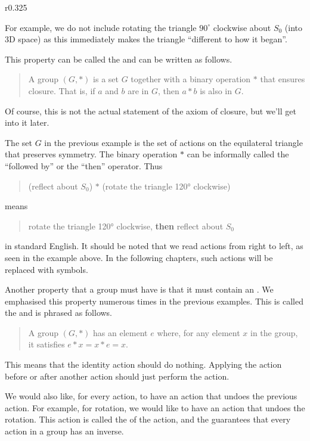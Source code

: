 \begin{wrapfigure}{r}{0.325\textwidth}
    \centering
\end{wrapfigure}

For example, we do not include rotating the triangle $90^\circ$ clockwise about $S_0$ (into 3D space) as this immediately makes the triangle ``different to how it began''.

This property can be called the  and can be written as follows.
\begin{quote}
    A group $(G, \ast)$ is a set $G$ together with a binary operation $\ast$ that ensures closure. That is, if $a$ and $b$ are in $G$, then $a \ast b$ is also in $G$.
\end{quote}
Of course, this is not the actual statement of the axiom of closure, but we'll get into it later.

The set $G$ in the previous example is the set of actions on the equilateral triangle that preserves symmetry. The binary operation $\ast$ can be informally called the ``followed by'' or the ``then'' operator. Thus
\begin{quote}
    (reflect about $S_0$) $\ast$ (rotate the triangle 120° clockwise)
\end{quote}
means
\begin{quote}
    rotate the triangle 120° clockwise, \textbf{then} reflect about $S_0$
\end{quote}
in standard English. It should be noted that we read actions from right to left, as seen in the example above. In the following chapters, such actions will be replaced with symbols.

Another property that a group must have is that it must contain an . We emphasised this property numerous times in the previous examples. This is called the  and is phrased as follows.
\begin{quote}
    A group $(G, \ast)$ has an element $e$ where, for any element $x$ in the group, it satisfies $e \ast x = x \ast e = x$.
\end{quote}
This means that the identity action should do nothing. Applying the action before or after another action should just perform the action.

We would also like, for every action, to have an action that undoes the previous action. For example, for rotation, we would like to have an action that undoes the rotation. This action is called the  of the action, and the  guarantees that every action in a group has an inverse.

